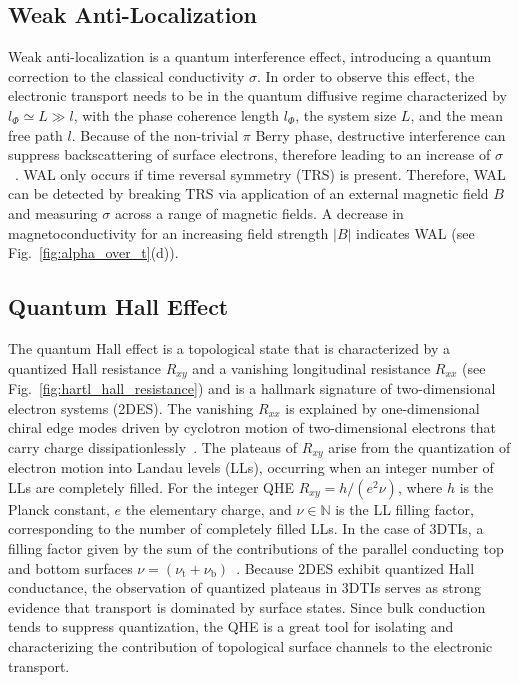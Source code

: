 \documentclass[twocolumn,10pt,a4paper]{article}
\begin{document}
\subsection{Weak Anti-Localization}
\label{sec:WAL}
Weak anti-localization is a quantum interference effect, introducing a quantum correction to the classical conductivity $\sigma$. In order to observe this effect, the electronic transport needs to be in the quantum diffusive regime characterized by $l_\Phi \simeq L \gg l$, with the phase coherence length $l_\Phi$, the system size $L$, and the mean free path $l$. Because of the non-trivial $\pi$ Berry phase, destructive interference can suppress backscattering of surface electrons, therefore leading to an increase of $\sigma$~\cite{Lu_2014}. WAL only occurs if time reversal symmetry (TRS) is present. Therefore, WAL can be detected by breaking TRS via application of an external magnetic field $B$ and measuring $\sigma$ across a range of magnetic fields. A decrease in magnetoconductivity for an increasing field strength $|B|$ indicates WAL (see Fig.~\ref{fig:alpha_over_t}(d)). 
\subsection{Quantum Hall Effect}
\label{sec:QHE}
The quantum Hall effect is a topological state that is characterized by a quantized Hall resistance $R_{xy}$ and a vanishing longitudinal resistance $R_{xx}$ (see Fig.\@~\ref{fig:hartl_hall_resistance}) and is a hallmark signature of two-dimensional electron systems (2DES). The vanishing $R_{xx}$ is explained by one-dimensional chiral edge modes driven by cyclotron motion of two-dimensional electrons that carry charge dissipationlessly~\cite{Yoshimi2015}. The plateaus of $R_{xy}$ arise from the quantization of electron motion into  Landau levels (LLs), occurring when an integer number of LLs are completely filled. For the integer QHE $R_{xy} = h/(e^2 \nu)$, where $h$ is the Planck constant, $e$ the elementary charge, and $\nu \in \mathbb{N}$ is the LL filling factor, corresponding to the number of completely filled LLs. In the case of 3DTIs, a filling factor given by the sum of the contributions of the parallel conducting top and bottom surfaces $\nu=(\nu_\mathrm{t}+\nu_\mathrm{b})$~\cite{Xu_2014}. Because 2DES exhibit quantized Hall conductance, the observation of quantized plateaus in 3DTIs serves as strong evidence that transport is dominated by surface states. Since bulk conduction tends to suppress quantization, the QHE is a great tool for isolating and characterizing the contribution of topological surface channels to the electronic transport.
\end{document}
